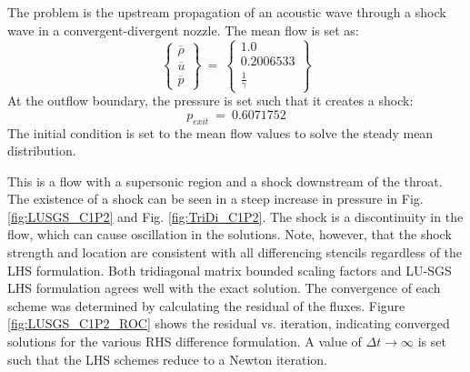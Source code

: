 \documentclass[conf]{new-aiaa}
\begin{document}
The problem is the upstream propagation of an acoustic wave through a shock wave in a convergent-divergent nozzle. 
The mean flow is set as:
\begin{equation*}
	\left\{
	\begin{matrix}
		\overline{\rho} \\
		\overline{u} \\
		\overline{p}
	\end{matrix}
	\right\}~=~
	\left\{
	\begin{matrix}
		1.0 \\
		0.2006533 \\
		\frac{1}{\gamma}
	\end{matrix}
	\right\}
\end{equation*}
At the outflow boundary, the pressure is set such that it creates a shock: 
\begin{equation*}
	p_{exit}~=~0.6071752
\end{equation*}
The initial condition is set to the mean flow values to solve the steady mean distribution. 

This is a flow with a supersonic region and a shock downstream of the throat. 
The existence of a shock can be seen in a steep increase in pressure in Fig. \ref{fig:LUSGS_C1P2} and Fig. \ref{fig:TriDi_C1P2}. 
The shock is a discontinuity in the flow, which can cause oscillation in the solutions. 
Note, however, that the shock strength and location are consistent with all differencing stencils regardless of the LHS formulation.  
Both tridiagonal matrix bounded scaling factors and LU-SGS LHS formulation agrees well with the exact solution. 
The convergence of each scheme was determined by calculating the residual of the fluxes. 
Figure \ref{fig:LUSGS_C1P2_ROC} shows the residual vs. iteration, indicating converged solutions for the various RHS difference formulation. 
A value of $\Delta{t}\to\infty$ is set such that the LHS schemes reduce to a Newton iteration.   
\end{document}
